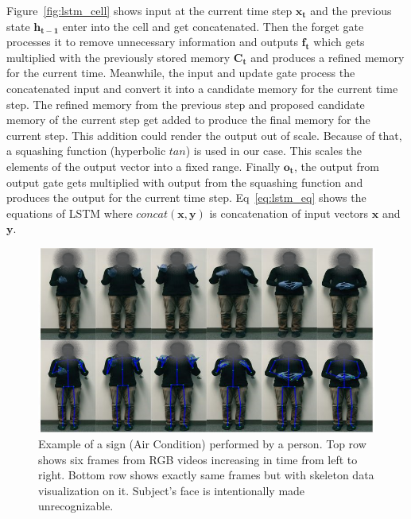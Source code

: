 \documentclass[10pt,twocolumn,letterpaper]{article}
\begin{document}
Figure~\ref{fig:lstm_cell} shows input at the current time step $\mathbf{x_t}$ and the 
previous state $\mathbf{h_{t-1}}$ enter into the cell and get concatenated. Then the forget gate processes it to remove
unnecessary information and outputs $\mathbf{f_t}$ which gets multiplied with the previously 
stored memory $\mathbf{C_t}$ and produces a refined memory for the current time. Meanwhile, the input 
and  update gate process the concatenated input and convert it into a candidate memory for the current time step. The refined memory from the previous step and proposed candidate memory of the current step get added to produce the final memory for the current step. This addition could render the output out of scale. Because of that, a squashing function (hyperbolic $tan$) is used 
in our case. This scales the elements of the output vector into a fixed range. Finally $\mathbf{o_t}$, the output 
from output gate gets multiplied with output from the squashing function and produces the output for the current time step. Eq~\ref{eq:lstm_eq} shows the equations of LSTM where $concat(\mathbf{x},\mathbf{y})$ is 
concatenation of input vectors $\mathbf{x}$ and $\mathbf{y}$.

\begin{figure}
	\begin{center}
		\includegraphics[width=.8\linewidth]{ac_person1_faceoff}
	\end{center}
	\caption{Example of a sign (Air Condition) performed by a person. Top row shows six frames from RGB videos increasing in time from left to right. Bottom row shows exactly same frames but with skeleton data visualization on it. Subject's face is intentionally made unrecognizable.}
	\label{fig:ac_person1}
\end{figure}
\end{document}
